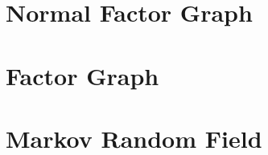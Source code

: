 \documentclass[11pt,fleqn]{book} %
\def\R{\mathbb{R}}
\begin{document}
\section{Normal Factor Graph}

\cite{FFG}

\section{Factor Graph}

\section{Markov Random Field}

\vskip 0.2in






\end{document}
